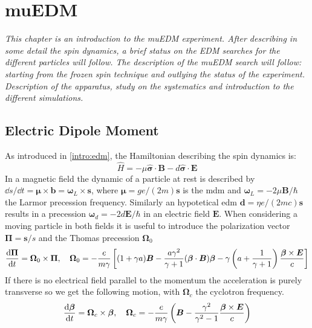 \chapter{muEDM}
\begin{refsection}

{\itshape
This chapter is an introduction to the muEDM experiment. After describing in some detail the spin dynamics, a brief status on the EDM searches for the different particles will follow.
The description of the muEDM search will follow: starting from the frozen spin technique and outlying the status of the experiment. 
Description of the apparatus, study on the systematics and introduction to the different simulations.}

\section{Electric Dipole Moment}
    As introduced in \ref{intro:edm}, the Hamiltonian describing the spin dynamics is:
    \begin{equation}
        \hat{H} = -\mu\bm{\hat{\sigma}\cdot B}-d\bm{\hat{\sigma}\cdot E}
    \end{equation}
    In a magnetic field the dynamic of a particle at rest is described by $\dd s/\dd t=\bm{\mu}\times\bm{b} = \bm{\omega}_L\times\bm{s}$, where $\bm{\mu}=ge/(2m)\bm{s}$ is the \gls{mdm} and $\bm{\omega}_L=-2\mu\bm{B}/\hbar$ the Larmor precession frequency.
    Similarly an hypotetical \gls{edm} $\bm{d}=\eta e/(2mc)\bm{s}$ results in a precession $\bm{\omega}_d=-2d\bm{E}/\hbar$ in an electric field $\bm{E}$.
    When considering a moving particle in both fields it is useful to introduce the polarization vector $\bm{\Pi}=\bm{s}/s$ and the Thomas precession $\bm{\Omega}_0$
    \begin{equation}
        \dv{\bm{\Pi}}{t}=\bm{\Omega}_0 \times \bm{\Pi}, \quad
        \bm{\Omega}_0 = -\frac{e}{m\gamma} \left[ (1+\gamma a)\bm{B}-\frac{a\gamma^2}{\gamma+1}(\bm{\beta}\cdot\bm{B})\bm{\beta}-\gamma \left( a+\frac{1}{\gamma+1} \right) \frac{\bm{\beta}\times \bm{E}}{c} \right]
    \end{equation}
    \cite{muEDM:Flavour:2008}\cite{muEDM:Ring:2004}
    If there is no electrical field parallel to the momentum the acceleration is purely transverse so we get the following motion, with $\bm{\Omega}_c$ the cyclotron frequency.
    \begin{equation}
        \dv{\bm{\beta}}{t}=\bm{\Omega}_c\times \bm{\beta}, \quad \bm{\Omega}_c = -\frac{e}{m\gamma}\left( \bm{B}- \frac{\gamma^2}{\gamma^2-1}\frac{\bm{\beta} \times \bm{E}}{c} \right)

\end{equation}
\end{refsection}
